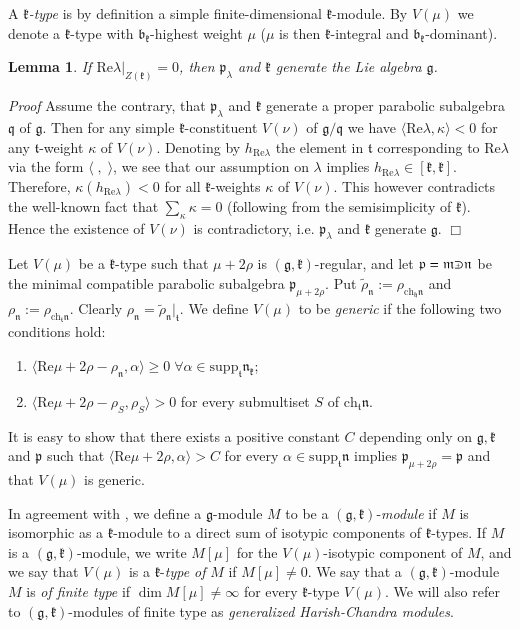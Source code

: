 \documentclass[11pt]{amsart}
\newcounter{theorem}
\newtheorem{lemma}[theo]{Lemma}
\renewenvironment{proof}{ \emph{Proof}}{$\Box$}
\renewcommand{\tt}{\mathfrak{t}}
\newcommand{\kk}{\mathfrak{k}}
\newcommand{\nn}{\mathfrak{n}}
\newcommand{\mm}{\mathfrak{m}}
\newcommand{\hh}{\mathfrak{h}}
\newcommand{\qq}{\mathfrak{q}}
\newcommand{\pp}{\mathfrak{p}}
\renewcommand{\gg}{\mathfrak{g}}
\newcommand{\bb}{\mathfrak{b}}
\newcommand{\supp}{\mathrm{supp}}
\newcommand{\ch}{\mathrm{ch}}
\def\crplus{\hbox{$\supset${\raise1.05pt\hbox{\kern -0.55em ${\scriptscriptstyle +}$}}\ }}
\begin{document}
A \textit{$\kk$-type} is by definition a simple finite-dimensional $\kk$-module. By $V(\mu)$ we denote a $\kk$-type with $\bb_\kk$-highest weight $\mu$ ($\mu$ is then $\kk$-integral and $\bb_\kk$-dominant). 

\begin{lemma}
If $\mathrm{Re}\lambda|_{Z(\kk)}=0$, then $\pp_\lambda$ and $\kk$ generate the Lie algebra $\gg$.
\end{lemma}
\begin{proof}
Assume the contrary, that $\pp_\lambda$ and $\kk$ generate a proper parabolic subalgebra $\qq$ of $\gg$. Then for any simple $\kk$-constituent $V(\nu)$ of $\gg/\qq$ we have $\langle \mathrm{Re} \lambda,\kappa \rangle<0$ for any $\tt$-weight $\kappa$ of $V(\nu)$. Denoting by $h_{\mathrm{Re}\lambda}$ the element in $\tt$ corresponding to $\mathrm{Re}\lambda$ via the form $\langle\;,\;\rangle$, we see that our assumption on $\lambda$ implies $h_{\mathrm{Re}\lambda}\in[\kk,\kk]$. Therefore, $\kappa(h_{\mathrm{Re}\lambda})<0$ for all $\kk$-weights $\kappa$ of $V(\nu)$. This however contradicts the well-known fact that $\sum_{\kappa}\kappa=0$ (following from the semisimplicity of $\kk$). Hence the existence of $V(\nu)$ is contradictory, i.e. $\pp_\lambda$ and $\kk$ generate $\gg$.
\end{proof}

Let $V(\mu)$ be a $\kk$-type such that $\mu+2\rho$ is $(\gg,\kk)$-regular, and let $\pp=\mm\crplus\nn$ be the minimal compatible parabolic subalgebra $\pp_{\mu+2\rho}$. Put $\tilde{\rho}_\nn :=\rho_{\ch_\hh \nn}$ and $\rho_\nn:=\rho_{\ch_\tt\nn}$. Clearly $\rho_\nn =\tilde{\rho}_\nn |_\tt$. We define $V(\mu)$ to be \textit{generic} if the following two conditions hold:
\begin{enumerate}
\item $\langle\mathrm{Re}\mu+2\rho-\rho_\nn,\alpha\rangle\geq 0\;\forall\alpha\in\supp_\tt\nn_\kk$;
\item $\langle\mathrm{Re}\mu+2\rho-\rho_S,\rho_S\rangle >0$ for every submultiset $S$ of $\ch_\tt\nn$.
\end{enumerate}

It is easy to show that there exists a positive constant $C$ depending only on $\gg,\kk$ and $\pp$ such that $\langle\mathrm{Re}\mu+2\rho,\alpha\rangle >C$ for every $\alpha\in\supp_\tt\nn$ implies $\pp_{\mu+2\rho}=\pp$ and that $V(\mu)$ is generic.

In agreement with \cite{PZ2}, we define a $\gg$-module $M$ to be a $(\gg,\kk)$-\textit{module} if $M$ is isomorphic as a $\kk$-module to a direct sum of isotypic components of $\kk$-types. If $M$ is a $(\gg,\kk)$-module, we write $M[\mu]$ for the $V(\mu)$-isotypic component of $M$, and we say that $V(\mu)$ is a $\kk$-\textit{type of} $M$ if $M[\mu]\neq 0$. We say that a $(\gg,\kk)$-module $M$ is \textit{of finite type} if $\dim M[\mu]\neq\infty$ for every $\kk$-type $V(\mu)$. We will also refer to $(\gg,\kk)$-modules of finite type as \textit{generalized Harish-Chandra modules}.
\end{document}
